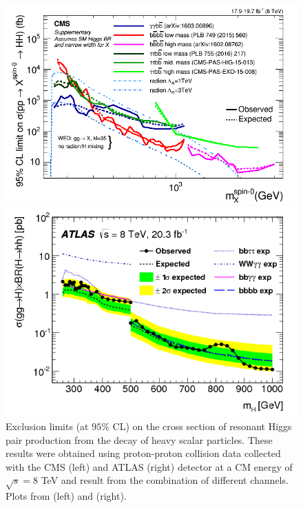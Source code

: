 \begin{figure}
	\centering
	\begin{minipage}{.5\textwidth}
		\centering
		\includegraphics[width=\linewidth]{./Figures/CMS_spin0_exc.png}
	\end{minipage}%
	\begin{minipage}{.5\textwidth}
		\centering
		\includegraphics[width=\linewidth]{./Figures/ATLASmH.png}
	\end{minipage}
	\caption{Exclusion limits (at $95\%$ CL) on the cross section of resonant Higgs pair production from the decay of heavy scalar particles. These results were obtained using proton-proton collision data collected with the CMS (left) and ATLAS (right) detector at a CM energy of $\sqrt{s}=8$ TeV and result from the combination of different channels. Plots from \cite{hhbbAA_CMS} (left) and \cite{ATLAShhBSMcomb} (right).}
	\label{fig:ATLAS_CMS_BSMlim}
\end{figure}

